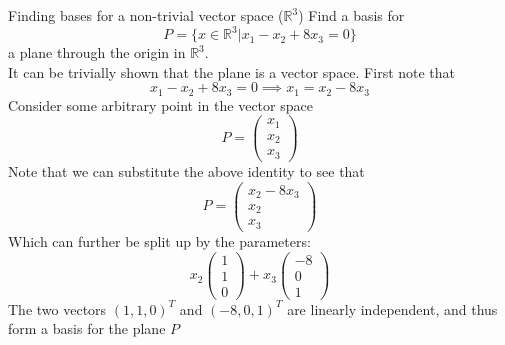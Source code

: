 \documentclass[journal, letterpaper]{IEEEtran}
\begin{document}
    \begin{myboxg}{Finding bases for a non-trivial vector space ($\mathbb{R}^3$)}
        Find a basis for 
        $$ P = \{x \in \mathbb{R}^3 | x_1 - x_2 + 8x_3 = 0\}$$
        a plane through the origin in $\mathbb{R}^3$.
        \newline \\ 
        It can be trivially shown that the plane is a vector space. First note that
        $$ x_1 - x_2 + 8x_3 = 0 \implies x_1 = x_2 - 8x_3$$
        Consider some arbitrary point in the vector space 
        $$ P = \begin{pmatrix}
            x_1 \\ x_2 \\ x_3
        \end{pmatrix}$$
        Note that we can substitute the above identity to see that 
        $$ P = \begin{pmatrix}
            x_2 - 8x_3 \\ x_2 \\ x_3
        \end{pmatrix}$$
        Which can further be split up by the parameters:
        $$
        x_2 \begin{pmatrix}
            1 \\ 1 \\ 0
        \end{pmatrix} + x_3\begin{pmatrix}
            -8 \\ 0 \\ 1
        \end{pmatrix}
        $$
        The two vectors $(1, 1, 0)^T$ and $(-8, 0, 1)^T$ are linearly independent, and thus form a basis for the plane $P$

    \end{myboxg}
\end{document}
